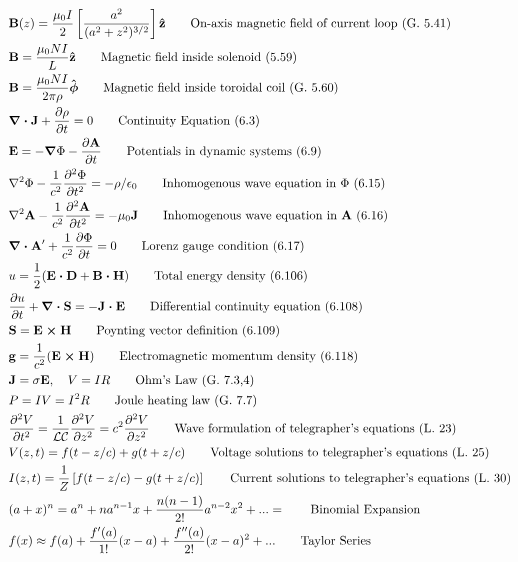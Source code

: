 \documentclass[10pt]{article}
\newcommand{\zhat}{\boldsymbol{\hat{\textbf{z}}}}
\newcommand{\phihat}{\boldsymbol{\hat{\textbf{$\phi$}}}}
\newcommand{\ve}[1]{\boldsymbol{\mathbf{#1}}}
\newcommand{\eo}{\epsilon_0}
\newcommand{\pder}[2]{\frac{\partial #1}{\partial #2}}
\newcommand{\dpder}[2]{\frac{\partial^2 #1}{\partial #2^2}}
\newcommand{\lrb}[1]{\left[ #1 \right]}
\begin{document}
\begin{multicols}{2}
\begin{align*}
		& \ve{B}(z) = \frac{\mu_0 I}{2} \lrb{ \frac{a^2}{(a^2 + z^2)^{3/2}} }\zhat \tag*{On-axis magnetic field of current loop (G. 5.41)} \\
		& \ve{B} = \frac{\mu_0 N I}{L} \zhat \tag*{Magnetic field inside solenoid (5.59)} \\
		& \ve{B} = \frac{\mu_0 N I}{2 \pi \rho} \phihat \tag*{Magnetic field inside toroidal coil (G. 5.60)} \\
		& \ve{\nabla \cdot J} + \pder{\rho}{t} = 0 \tag*{Continuity Equation (6.3)} \\
		& \ve{E} = -\ve{\nabla} \Phi - \pder{\ve{A}}{t} \tag*{Potentials in dynamic systems (6.9)} \\
		& \nabla^2 \Phi - \frac{1}{c^2} \dpder{\Phi}{t} = -\rho / \eo \tag*{Inhomogenous wave equation in $\Phi$ (6.15)} \\
		& \nabla^2 \ve{A} - \frac{1}{c^2} \dpder{\ve{A}}{t} = -\mu_0 \ve{J} \tag*{Inhomogenous wave equation in $\ve{A}$ (6.16)} \\
		& \ve{\nabla \cdot A}' + \frac{1}{c^2} \pder{\Phi}{t} = 0 \tag*{Lorenz gauge condition (6.17)} \\
		& u = \frac{1}{2}(\ve{E \cdot D} + \ve{B \cdot H}) \tag*{Total energy density (6.106)} \\
		& \pder{u}{t} + \ve{\nabla \cdot S} = - \ve{J \cdot E} \tag*{Differential continuity equation (6.108)} \\
		& \ve{S} = \ve{E \times H} \tag*{Poynting vector definition (6.109)} \\
		& \ve{g} = \frac{1}{c^2} (\ve{E \times H}) \tag*{Electromagnetic momentum density (6.118)} \\
		& \ve{J} = \sigma \ve{E}, \quad V = IR \tag*{Ohm's Law (G. 7.3,4)} \\
		& P = IV = I^2 R \tag*{Joule heating law (G. 7.7)} \\
		& \dpder{V}{t} = \frac{1}{\mathcal{LC}} \dpder{V}{z} = c^2 \dpder{V}{z} \tag*{Wave formulation of telegrapher's equations (L. 23)} \\
		& V(z,t) = f(t-z/c) + g(t+z/c) \tag*{Voltage solutions to telegrapher's equations (L. 25)} \\
		& I(z,t) = \frac{1}{Z} \lrb{f(t-z/c) - g(t+z/c)} \tag*{Current solutions to telegrapher's equations (L. 30)} \\
		& (a + x)^n = a^n + n a^{n-1} x + \frac{n (n-1)}{2!} a^{n-2} x^2 + ... =  \tag*{Binomial Expansion} \\
		& f(x) \approx f(a) + \frac{f'(a)}{1!}(x-a) + \frac{f''(a)}{2!}(x-a)^2 + ...  \tag*{Taylor Series} \\

\end{align*}
\end{multicols}
\end{document}
